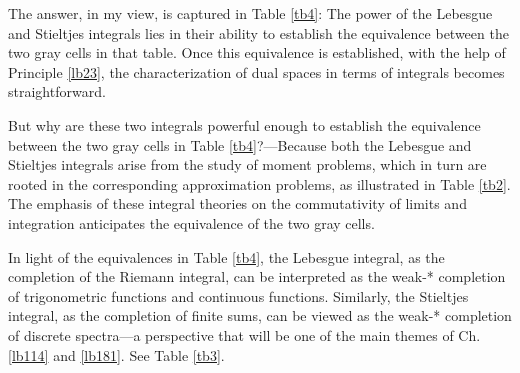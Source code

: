 \documentclass[12pt,b5paper,notitlepage]{article}
\theoremstyle{definition}
\theoremstyle{plain}
\numberwithin{equation}{section}
\begin{document}
The answer, in my view, is captured in Table \ref{tb4}: The power of the Lebesgue and Stieltjes integrals lies in their ability to establish the equivalence between the two gray cells in that table. Once this equivalence is established, with the help of Principle \ref{lb23}, the characterization of dual spaces in terms of integrals becomes straightforward.

But why are these two integrals powerful enough to establish the equivalence between the two gray cells in Table \ref{tb4}?---Because both the Lebesgue and Stieltjes integrals arise from the study of moment problems, which in turn are rooted in the corresponding approximation problems, as illustrated in Table \ref{tb2}. The emphasis of these integral theories on the commutativity of limits and integration anticipates the equivalence of the two gray cells.

In light of the equivalences in Table \ref{tb4}, the Lebesgue integral, as the completion of the Riemann integral, can be interpreted as the weak-* completion of trigonometric functions and continuous functions. Similarly, the Stieltjes integral, as the completion of finite sums, can be viewed as the weak-* completion of discrete spectra---a perspective that will be one of the main themes of Ch. \ref{lb114} and \ref{lb181}. See Table \ref{tb3}.
\end{document}
